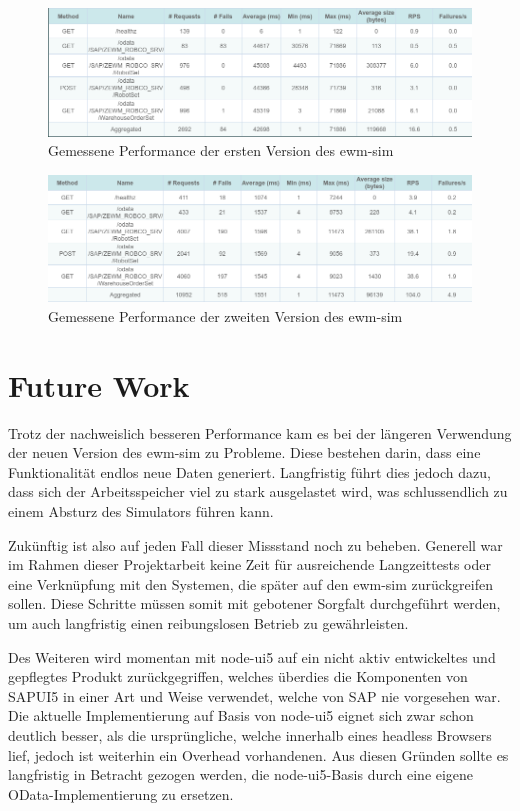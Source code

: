 \begin{figure}[!ht]
	\centering
	\includegraphics[width=\textwidth]{Bilder/perf-v1.png}
	\caption{Gemessene Performance der ersten Version des \ac{ewm-sim}}
	\label{fig:perf-v1}
\end{figure}

\begin{figure}[!ht]
	\centering
	\includegraphics[width=\textwidth]{Bilder/perf-v2.png}
	\caption{Gemessene Performance der zweiten Version des \ac{ewm-sim}}
	\label{fig:perf-v2}
\end{figure}

\section{Future Work}
Trotz der nachweislich besseren Performance kam es bei der längeren Verwendung der neuen Version des \ac{ewm-sim} zu Probleme.
Diese bestehen darin, dass eine Funktionalität endlos neue Daten generiert.
Langfristig führt dies jedoch dazu, dass sich der Arbeitsspeicher viel zu stark ausgelastet wird, was schlussendlich zu einem Absturz des Simulators führen kann.

Zukünftig ist also auf jeden Fall dieser Missstand noch zu beheben.
Generell war im Rahmen dieser Projektarbeit keine Zeit für ausreichende Langzeittests oder eine Verknüpfung mit den Systemen, die später auf den \ac{ewm-sim} zurückgreifen sollen.
Diese Schritte müssen somit mit gebotener Sorgfalt durchgeführt werden, um auch langfristig einen reibungslosen Betrieb zu gewährleisten.

Des Weiteren wird momentan mit node-ui5 auf ein nicht aktiv entwickeltes und gepflegtes Produkt zurückgegriffen, welches überdies die Komponenten von SAPUI5 in einer Art und Weise verwendet, welche von SAP nie vorgesehen war.
Die aktuelle Implementierung auf Basis von node-ui5 eignet sich zwar schon deutlich besser, als die ursprüngliche, welche innerhalb eines headless Browsers lief, jedoch ist weiterhin ein Overhead vorhandenen.
Aus diesen Gründen sollte es langfristig in Betracht gezogen werden, die node-ui5-Basis durch eine eigene OData-Implementierung zu ersetzen.

